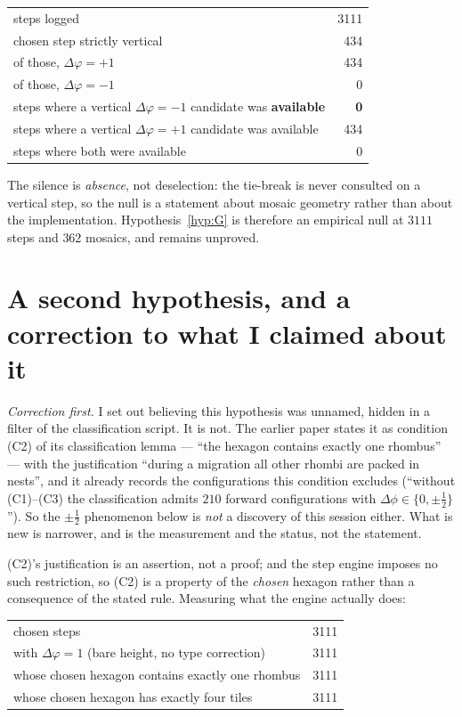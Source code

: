 \documentclass[11pt]{article}
\theoremstyle{plain}
\theoremstyle{definition}
\begin{document}
\begin{center}
\begin{tabular}{lr}
\toprule
steps logged & 3111\\
chosen step strictly vertical & 434\\
\quad of those, $\Delta\varphi=+1$ & 434\\
\quad of those, $\Delta\varphi=-1$ & 0\\
\midrule
steps where a vertical $\Delta\varphi=-1$ candidate was \textbf{available} & \textbf{0}\\
steps where a vertical $\Delta\varphi=+1$ candidate was available & 434\\
steps where both were available & 0\\
\bottomrule
\end{tabular}
\end{center}

The silence is \emph{absence}, not deselection: the tie-break is never consulted
on a vertical step, so the null is a statement about mosaic geometry rather than
about the implementation.  Hypothesis~\ref{hyp:G} is therefore an empirical null
at $3111$ steps and $362$ mosaics, and remains unproved.

\section{A second hypothesis, and a correction to what I claimed about it}

\emph{Correction first.}  I set out believing this hypothesis was unnamed, hidden
in a filter of the classification script.  It is not.  The earlier paper states it
as condition (C2) of its classification lemma --- ``the hexagon contains exactly one
rhombus'' --- with the justification ``during a migration all other rhombi are
packed in nests'', and it already records the configurations this condition
excludes (``without (C1)--(C3) the classification admits $210$ forward
configurations with $\Delta\phi\in\{0,\pm\tfrac12\}$'').  So the $\pm\tfrac12$
phenomenon below is \emph{not} a discovery of this session either.  What is new is
narrower, and is the measurement and the status, not the statement.

(C2)'s justification is an assertion, not a proof; and the step engine imposes no
such restriction, so (C2) is a property of the \emph{chosen} hexagon rather than a
consequence of the stated rule.  Measuring what the engine actually does:

\begin{center}
\begin{tabular}{lr}
\toprule
chosen steps & 3111\\
with $\Delta\varphi=1$ (bare height, no type correction) & 3111\\
whose chosen hexagon contains exactly one rhombus & 3111\\
whose chosen hexagon has exactly four tiles & 3111\\
\bottomrule
\end{tabular}
\end{center}
\end{document}
